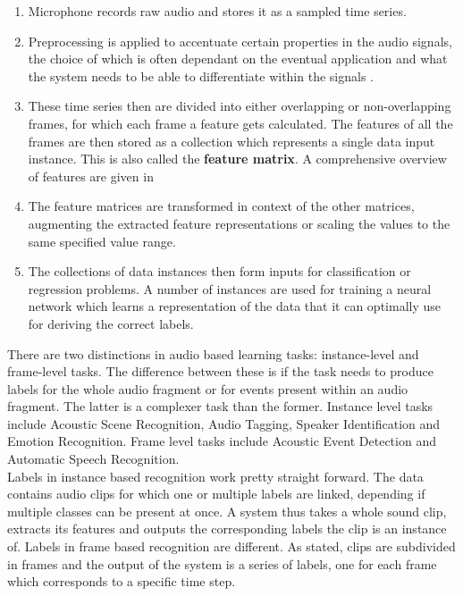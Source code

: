 \begin{enumerate}
	\item Microphone records raw audio and stores it as a sampled time series. 
	\item Preprocessing is applied to accentuate certain properties in the audio signals, the choice of which is often dependant on the eventual application and what the system needs to be able to differentiate within the signals \citep{georgiev2017heterogeneous}. 
	\item These time series then are divided into either overlapping or non-overlapping frames, for which each frame a feature gets calculated. The features of all the frames are then stored as a collection which represents a single data input instance. This is also called the \textbf{feature matrix}. A comprehensive overview of features are given in \cite{mitrovic2010features}
	\item The feature matrices are transformed in context of the other matrices, augmenting the extracted feature representations or scaling the values to the same specified value range. 
	\item The collections of data instances then form inputs for classification or regression problems. A number of instances are used for training a neural network which learns a representation of the data that it can optimally use for deriving the correct labels.
\end{enumerate}

There are two distinctions in audio based learning tasks: instance-level and frame-level tasks. The difference between these is if the task needs to produce labels for the whole audio fragment or for events present within an audio fragment. The latter is a complexer task than the former.  Instance level tasks include Acoustic Scene Recognition, Audio Tagging, Speaker Identification and Emotion Recognition. Frame level tasks include Acoustic Event Detection and Automatic Speech Recognition. \\

Labels in instance based recognition work pretty straight forward. The data contains audio clips for which one or multiple labels are linked, depending if multiple classes can be present at once. A system thus takes a whole sound clip, extracts its features and outputs the corresponding labels the clip is an instance of. Labels in frame based recognition are different. As stated, clips are subdivided in frames and the output of the system is a series of labels, one for each frame which corresponds to a specific time step. \\


